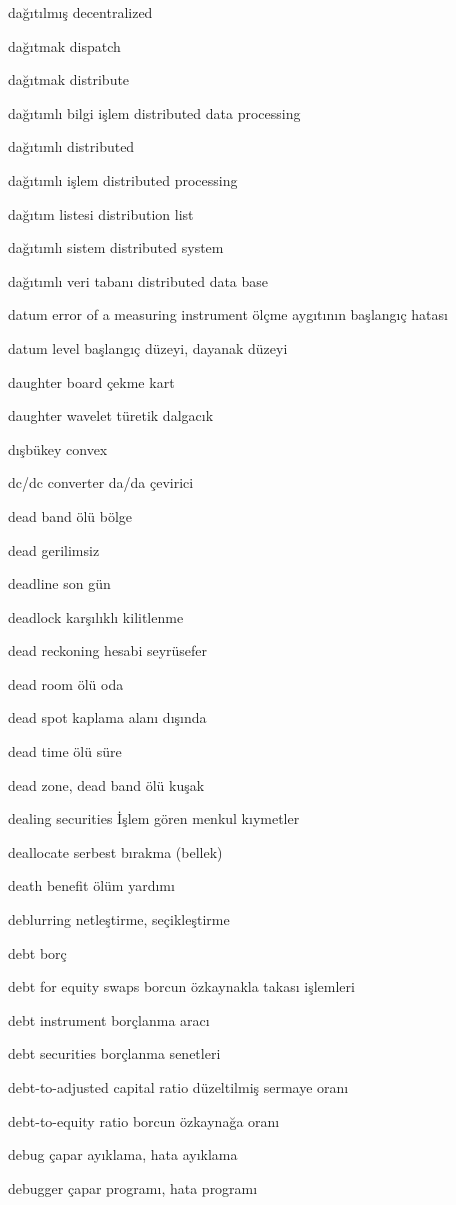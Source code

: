 \documentclass[12pt,fleqn]{article}\usepackage{../../common}
\begin{document}
dağıtılmış decentralized

dağıtmak dispatch

dağıtmak distribute

dağıtımlı bilgi işlem distributed data processing

dağıtımlı distributed

dağıtımlı işlem distributed processing

dağıtım listesi distribution list

dağıtımlı sistem distributed system

dağıtımlı veri tabanı distributed data base

datum error of a measuring instrument ölçme aygıtının başlangıç hatası

datum level başlangıç düzeyi, dayanak düzeyi

daughter board çekme kart

daughter wavelet türetik dalgacık

dışbükey convex

dc/dc converter da/da çevirici

dead band ölü bölge

dead gerilimsiz

deadline son gün

deadlock karşılıklı kilitlenme

dead reckoning hesabi seyrüsefer

dead room ölü oda

dead spot kaplama alanı dışında

dead time ölü süre

dead zone, dead band ölü kuşak

dealing securities İşlem gören menkul kıymetler

deallocate serbest bırakma (bellek)

death benefit ölüm yardımı

deblurring netleştirme, seçikleştirme

debt borç

debt for equity swaps borcun özkaynakla takası işlemleri

debt instrument borçlanma aracı

debt securities borçlanma senetleri

debt-to-adjusted capital ratio düzeltilmiş sermaye oranı

debt-to-equity ratio borcun özkaynağa oranı

debug çapar ayıklama, hata ayıklama

debugger çapar programı, hata programı
\end{document}
